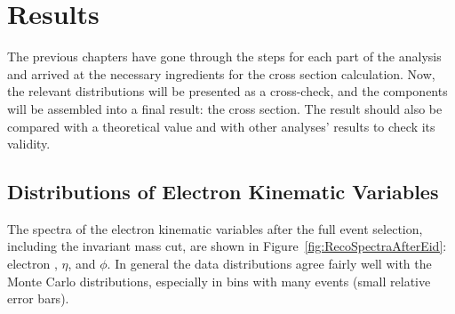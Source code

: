 \chapter{Results}
\label{res}

The previous chapters have gone through the steps 
for each part of the analysis 
and arrived at the necessary ingredients 
for the cross section calculation.  
Now, the relevant distributions will be presented 
as a cross-check, 
and the components will be assembled into a 
final result: the \Zee cross section.  
The result should also be compared with 
a theoretical value and with other 
analyses' results to check its validity.  

\section{Distributions of Electron Kinematic Variables}
\label{res:elecQuants}

The spectra of the electron kinematic variables after the full 
event selection, including the invariant mass cut, 
are shown in Figure~\ref{fig:RecoSpectraAfterEid}: 
electron \pt, $\eta$, and $\phi$.  
In general the data distributions agree fairly well with the 
Monte Carlo distributions, 
especially in bins with many events (small relative error bars).  



